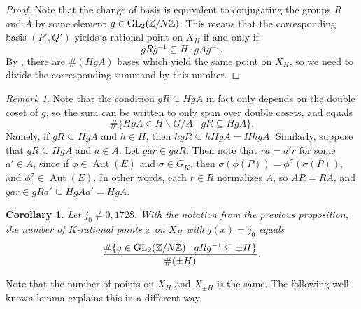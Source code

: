 \documentclass[10pt,leqno]{amsart}
\newcommand\sm[1]{\begin{bsmallmatrix}#1\end{bsmallmatrix}}
\newcommand{\Z}{\mathbb{Z}}
\newcommand{\GL}{\textnormal{GL}}
\DeclareMathOperator{\Aut}{Aut}
\newtheorem{corollary}[theorem]{Corollary}
\theoremstyle{definition}
\theoremstyle{remark}
\newtheorem{remark}[theorem]{Remark}
\numberwithin{theorem}{section}
\begin{document}
\begin{proof}
    Note that the change of basis is equivalent to conjugating the groups $R$ and $A$ by some element $g \in \GL_2(\Z/N\Z)$. This means that the corresponding basis $(P',Q')$ yields a rational point on $X_H$ if and only if $$gRg^{-1} \subseteq H\cdot gAg^{-1}.$$
    By , there are $\#(HgA)$ bases which yield the same point on $X_H$, so we need to divide the corresponding summand by this number.
\end{proof}

\begin{remark}
Note that the condition $gR \subseteq HgA$ in fact only depends on the double coset of $g$, so the sum can be written to only span over double cosets, and equals $$\#\{HgA \in H\backslash G/A \mid gR\subseteq HgA\}.$$
Namely, if $gR \subseteq HgA$ and $h\in H$, then $hgR\subseteq hHgA=HhgA$.  Similarly, suppose that $gR \subseteq HgA$ and $a \in A$. Let $gar \in gaR$. Then note that $ra=a'r$ for some $a' \in A$, since if $\phi \in \Aut(E)$ and $\sigma \in G_K$, then $\sigma(\phi(P))=\phi^\sigma(\sigma(P))$, and $\phi^\sigma \in \Aut(E)$. In other words, each $r \in R$ normalizes $A$, so $AR=RA$, and $gar \in gRa'\subseteq HgAa'=HgA$.
\end{remark}



\begin{corollary}
    Let $j_0\neq 0, 1728$. With the notation from the previous proposition, the number of $K$-rational points $x$ on $X_H$ with $j(x)=j_0$ equals $$\frac{\#\{g \in \GL_2(\Z/N\Z) \mid gRg^{-1} \subseteq \pm H\}}{\#(\pm H)}.$$
\end{corollary}

Note that the number of points on $X_H$ and $X_{\pm H}$ is the same. The following well-known lemma explains this in a different way.


    
\end{document}
